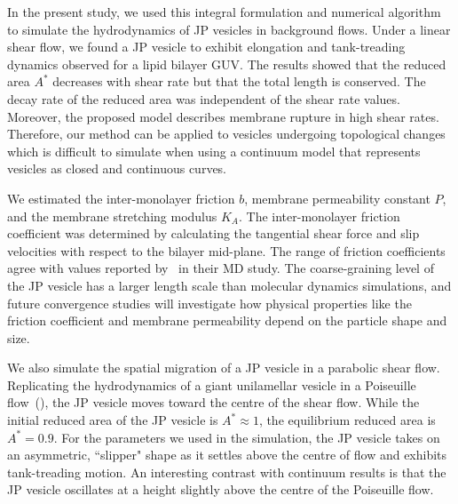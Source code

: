 \documentclass[lineno]{jfm}
\begin{document}
In the present study, we used this integral formulation and numerical
algorithm to simulate the hydrodynamics of JP vesicles in background
flows. Under a linear shear flow, we found a JP vesicle to exhibit
elongation and tank-treading dynamics observed for a lipid bilayer GUV.
%
%
The results showed that the reduced area $A^*$ decreases with shear rate
but that the total length is conserved. The decay rate
of the reduced area was independent of the shear rate values. Moreover, the proposed model
describes membrane rupture in high shear rates. Therefore, our method
can be applied to vesicles undergoing topological changes which is
difficult to simulate when using a continuum model that represents
vesicles as closed and continuous curves.
%
%

%
%
We estimated the inter-monolayer friction $b$, membrane permeability
constant $P$, and the membrane stretching modulus $K_A$. The
inter-monolayer friction coefficient was determined by calculating the
tangential shear force and slip velocities with respect to the bilayer
mid-plane. The range of friction coefficients agree with values reported
by~\cite{denOtter2007} in their MD study. The coarse-graining level of
the JP vesicle has a larger length scale than molecular dynamics
simulations, and future convergence studies will investigate
how physical properties like the friction coefficient and membrane
permeability depend on the particle shape and size.

We also simulate the spatial migration of a JP vesicle in a parabolic
shear flow. 
%
Replicating the hydrodynamics of a giant unilamellar vesicle in a Poiseuille
flow~(\cite{Kaoui09, dan-vla-mis2009, cou-kao-pod-mis2008}), the JP
vesicle moves toward the centre of the shear flow. While the initial
reduced area of the JP vesicle is $A^* \approx 1$, the equilibrium
reduced area is $A^*=0.9$. For the parameters we used in the simulation,
the JP vesicle takes on an asymmetric, ``slipper" shape as it settles
above the centre of flow and exhibits tank-treading motion.
An interesting contrast with continuum results is that the JP
vesicle oscillates at a height slightly above the centre of the
Poiseuille flow. 
\end{document}

